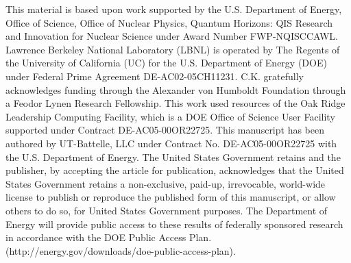 \documentclass[10pt]{iopart}
\begin{document}
This material is based upon work supported by the U.S. Department of Energy, Office of Science, Office of Nuclear Physics, Quantum Horizons: QIS Research and Innovation for Nuclear Science under Award Number FWP-NQISCCAWL.
Lawrence Berkeley National Laboratory (LBNL) is operated by The Regents of the University of California (UC) for the U.S. Department of Energy (DOE) under Federal Prime Agreement DE-AC02-05CH11231.
C.K. gratefully acknowledges funding through the Alexander von Humboldt Foundation through a Feodor Lynen Research Fellowship.
This work used resources of the Oak Ridge Leadership Computing Facility, which is a DOE Office of Science User Facility supported under Contract DE-AC05-00OR22725.
This manuscript has been authored by UT-Battelle, LLC under Contract No. DE-AC05-00OR22725 with the U.S. Department of Energy.
The United States Government retains and the publisher, by accepting the article for publication, acknowledges that the United States Government retains a non-exclusive, paid-up, irrevocable, world-wide license to publish or reproduce the published form of this manuscript, or allow others to do so, for United States Government purposes. The Department of Energy will provide public access to these results of federally sponsored research in accordance with the DOE Public Access Plan. (http://energy.gov/downloads/doe-public-access-plan).


%
%
%
%
\end{document}
